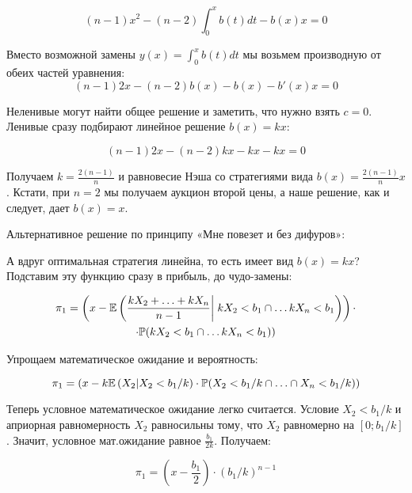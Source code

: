 \begin{enumerate}
\begin{equation}
(n-1)x^{2}-(n-2)\int_{0}^{x}b(t)dt -b(x)x=0
\end{equation}

Вместо возможной замены $ y(x)=\int_{0}^{x}b(t)dt $ мы возьмем производную от обеих частей уравнения:
\begin{equation}
(n-1)2x-(n-2)b(x)-b(x)-b'(x)x=0
\end{equation}

Неленивые могут найти общее решение и заметить, что нужно взять $ c=0 $. Ленивые сразу подбирают линейное решение $ b(x)=kx $:

\begin{equation}
(n-1)2x-(n-2)kx-kx-kx=0
\end{equation}

Получаем $ k=\frac{2(n-1)}{n} $ и равновесие Нэша со стратегиями вида $ b(x)=\frac{2(n-1)}{n}x $. Кстати, при $ n=2 $ мы получаем аукцион второй цены, а наше решение, как и следует, дает $ b(x)=x $.

Альтернативное решение по принципу «Мне повезет и без дифуров»:

А вдруг оптимальная стратегия линейна, то есть имеет вид $ b(x)=kx $? Подставим эту функцию сразу в прибыль, до чудо-замены:

\begin{multline}
\pi_{1}=\left(x-\E\left(\frac{kX_{2}+\ldots+kX_{n}}{n-1}\right|\left.\vphantom{\frac{kX_{2}+\ldots+kX_{n}}{n-1}}kX_{2}<b_{1}\cap \ldots kX_{n}<b_{1}\right)\right)\cdot \\
\cdot \P(kX_{2}<b_{1}\cap \ldots kX_{n}<b_{1}))
\end{multline}

Упрощаем математическое ожидание и вероятность:

\begin{equation}
\pi_{1}=(x-k\mathbb{E}\left(X_{2}|X_{2}<b_{1}/k\right)\cdot \mathbb{P}(X_{2}<b_{1}/k\cap \ldots \cap X_{n}<b_{1}/k))
\end{equation}

Теперь условное математическое ожидание легко считается. Условие $ X_{2}<b_{1}/k $ и априорная равномерность $ X_{2} $ равносильны тому, что $ X_{2} $ равномерно на $ [0;b_{1}/k] $. Значит, условное мат.ожидание равное $ \frac{b_{1}}{2k} $. Получаем:

\begin{equation}
\pi_{1}=\left( x-\frac{b_{1}}{2}\right)\cdot (b_{1}/k)^{n-1}
\end{equation}


\end{enumerate}
